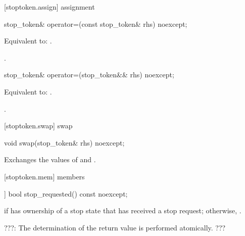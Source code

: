 {%
[stoptoken.assign]{ assignment}

%
\begin{itemdecl}
stop_token& operator=(const stop_token& rhs) noexcept;
\end{itemdecl}
\begin{itemdescr}
  \pnum\effects Equivalent to: .

  \pnum\returns {}.
\end{itemdescr}

%
\begin{itemdecl}
stop_token& operator=(stop_token&& rhs) noexcept;
\end{itemdecl}
\begin{itemdescr}
  \pnum\effects Equivalent to: .

  \pnum\returns {}.
\end{itemdescr}

[stoptoken.swap]{ swap}

%
\begin{itemdecl}
void swap(stop_token& rhs) noexcept;
\end{itemdecl}

\begin{itemdescr}
\pnum
\effects Exchanges the values of  and .
\end{itemdescr}


\clearpage

[stoptoken.mem]{ members}

%
\begin{itemdecl}
[[nodiscard]] bool stop_requested() const noexcept;
\end{itemdecl}
\begin{itemdescr}
  \pnum\returns {} if  has ownership of a stop state that has received a stop request;
                otherwise, .
                
                {\color{blue} ???:}
                The determination of the return value is performed atomically.
                {\color{blue} ???}


\end{itemdescr}}
